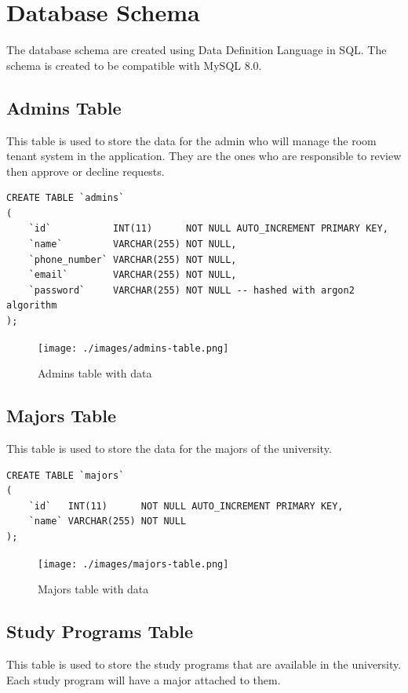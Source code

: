 \documentclass[12pt,titlepage]{article}
\begin{document}
\pagebreak

\section{Database Schema}
The database schema are created using Data Definition Language in SQL. 
The schema is created to be compatible with MySQL 8.0.

\subsection{Admins Table}
This table is used to store the data for the admin who will manage the room tenant system in the application.
They are the ones who are responsible to review then approve or decline requests.

\begin{verbatim}
CREATE TABLE `admins`
(
    `id`           INT(11)      NOT NULL AUTO_INCREMENT PRIMARY KEY,
    `name`         VARCHAR(255) NOT NULL,
    `phone_number` VARCHAR(255) NOT NULL,
    `email`        VARCHAR(255) NOT NULL,
    `password`     VARCHAR(255) NOT NULL -- hashed with argon2 algorithm
);
\end{verbatim}

\begin{figure}[h]
    \centering
    \texttt{[image: ./images/admins-table.png]}
    \caption{Admins table with data}
\end{figure}

\subsection{Majors Table}
This table is used to store the data for the majors of the university.

\begin{verbatim}
CREATE TABLE `majors`
(
    `id`   INT(11)      NOT NULL AUTO_INCREMENT PRIMARY KEY,
    `name` VARCHAR(255) NOT NULL
);
\end{verbatim}

\begin{figure}[h]
    \centering
    \texttt{[image: ./images/majors-table.png]}
    \caption{Majors table with data}
\end{figure}

\subsection{Study Programs Table}
This table is used to store the study programs that are available in the university.
Each study program will have a major attached to them.
\end{document}
